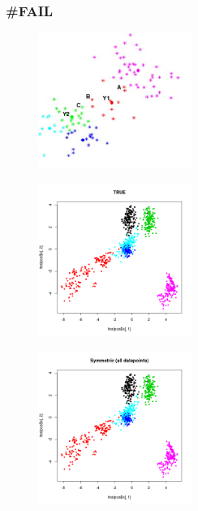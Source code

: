 \documentclass{beamer}
\begin{document}
\begin{frame}
\frametitle{#FAIL}
  \begin{figure}[h]
    \centering
\includegraphics[width = 5cm]{fail}  
  \end{figure}
\end{frame}


\begin{frame}
  \begin{figure}[h]
    \centering
\includegraphics[width = 5cm]{303_true_data}  
  \end{figure}
\end{frame}

\begin{frame}
  \begin{figure}[h]
    \centering
\includegraphics[width = 5cm]{303_s_data}  
  \end{figure}
\end{frame}



\end{document}
